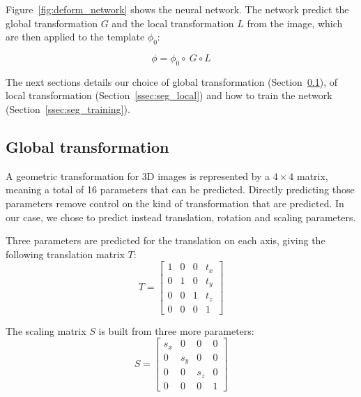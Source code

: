 Figure~\ref{fig:deform_network} shows the neural network. The network predict the global transformation $G$ and the local transformation $L$ from the image, which are then applied to the template $\phi_0$:

\begin{equation}
    \phi = \phi_0 \circ \ G \circ L
\end{equation}

The next sections details our choice of global transformation (Section~\ref{ssec:seg_global}), of local transformation (Section~\ref{ssec:seg_local}) and how to train the network (Section~\ref{ssec:seg_training}).

\subsection{Global transformation}
\label{ssec:seg_global}

A geometric transformation for 3D images is represented by a $4 \times 4$ matrix, meaning a total of 16 parameters that can be predicted. Directly predicting those parameters remove control on the kind of transformation that are predicted. In our case, we chose to predict instead translation, rotation and scaling parameters. 

Three parameters are predicted for the translation on each axis, giving the following translation matrix $T$:
\begin{equation*}
    T = 
    \begin{bmatrix}
        1 & 0 & 0 & t_x \\
        0 & 1 & 0 & t_y \\
        0 & 0 & 1 & t_z \\ 
        0 & 0 & 0 & 1
    \end{bmatrix}
\end{equation*}

The scaling matrix $S$ is built from three more parameters:
\begin{equation*}
    S = 
    \begin{bmatrix}
        s_x & 0 & 0 & 0 \\
        0 & s_y & 0 & 0 \\
        0 & 0 & s_z & 0 \\ 
        0 & 0 & 0 & 1
    \end{bmatrix}
\end{equation*}

